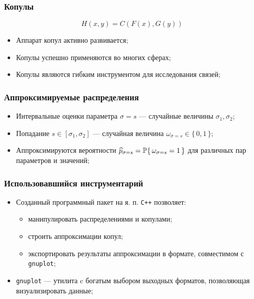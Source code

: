 \documentclass[11pt]{beamer}
\begin{document}
\begin{frame}
\begin{center}
\frametitle{Копулы}
\begin{equation}
H(x, y) = C(F(x), G(y))
\end{equation}
\begin{itemize}
  \item Аппарат копул активно развивается;
  \item Копулы успешно применяются во многих сферах;
  \item Копулы являются гибким инструментом для исследования связей;
\end{itemize}
\end{center}
\end{frame}

\begin{frame}
\begin{center}
\frametitle{Аппроксимируемые распределения}
\begin{itemize}
  \item Интервальные оценки параметра $\sigma = s$ --- случайные величины $\sigma_1, \sigma_2$;
  \item Попадание $s \in [\sigma_1, \sigma_2]$ --- случайная величина $\omega_{\sigma = s} \in \{\,0,1\,\}$;
  \item Аппроксимируются вероятности $\widehat{p}_{\sigma = s} = \P\{\, \omega_{\sigma = s} = 1\,\}$ для различных пар параметров и значений;
\end{itemize}
\end{center}
\end{frame}

\begin{frame}
\begin{center}
\frametitle{Использовавшийся инструментарий}
\begin{itemize}
  \item Созданный программный пакет на я. п. \texttt{C++} позволяет:
    \begin{itemize}
      \item манипулировать распределениями и копулами;
      \item строить аппроксимации копул;
      \item экспортировать результаты аппроксимации в формате, совместимом с \texttt{gnuplot};
    \end{itemize}
  \item \texttt{gnuplot} --- утилита c богатым выбором выходных форматов, позволяющая визуализировать данные;
\end{itemize}
\end{center}
\end{frame}
\end{document}
